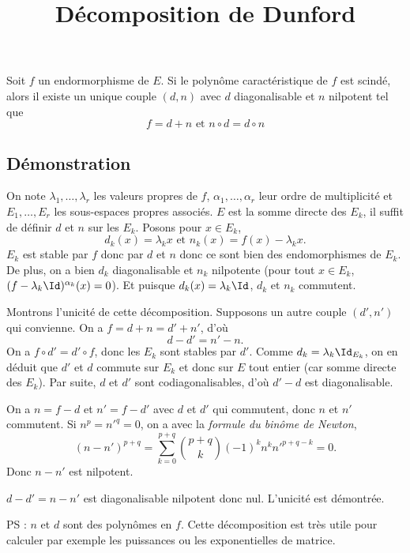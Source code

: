 \documentclass[fontsize=12pt,twoside=false,parskip=half, french]{scrartcl}
\title{Décomposition de Dunford}
\date{}
\author{}
\begin{document}
\maketitle
   \begin{Theoreme}
      Soit $f$ un endormorphisme de $E$. Si le polynôme caractéristique de $f$ est scindé, alors 
      il existe un unique couple $(d, n)$ avec $d$ diagonalisable et $n$ nilpotent tel que
      \[
         f = d + n \text{ et } n \circ d = d \circ n
      \]
   \end{Theoreme}
   \subsection{Démonstration}
      On note $\lambda_1, \ldots, \lambda_r$ les valeurs propres de $f$, $\alpha_1, \ldots, \alpha_r$ leur ordre de 
      multiplicité et $E_1, \ldots, E_r$ les sous-espaces propres associés. $E$ est la somme directe des $E_k$, il 
      suffit de définir $d$ et $n$ sur les $E_k$. Posons pour $x \in E_k$,
      \[
         d_k(x) = \lambda_k x \text{ et } n_k(x) = f(x) - \lambda_k x.
      \]
      $E_k$ est stable par $f$ donc par $d$ et $n$ donc ce sont bien des endomorphismes de $E_k$. De plus, 
      on a bien $d_k$ diagonalisable et $n_k$ nilpotente (pour tout $x \in E_k$, $(f - \lambda_k \Id)^{\alpha_k}(x) = 0$). 
      Et puisque $d_k(x) = \lambda_k \Id$, $d_k$ et $n_k$ commutent.

      Montrons l’unicité de cette décomposition. Supposons un autre couple $(d', n')$ qui convienne. On a $f = d + n = d' + n'$, d'où
      \[
         d - d' = n' - n.
      \]        
      On a $f \circ d' = d' \circ f$, donc les $E_k$ sont stables par $d'$. Comme $d_k = \lambda_k \Id_{E_k}$, on en déduit que $d'$ et $d$ commute sur $E_k$ et donc sur $E$ tout entier (car somme directe des $E_k$). Par suite, $d$ et $d'$ sont codiagonalisables, d'où $d' - d$ est diagonalisable.
      
      On a $n = f - d$ et $n' = f - d'$ avec $d$ et $d'$ qui commutent, donc $n$ et $n'$ 
      commutent. Si $n^p = n'^q = 0$, on a avec la \emph{formule du binôme de Newton},
      \[
         (n - n')^{p + q} = \sum_{k = 0}^{p + q} \binom{p + q}{k} (-1)^k n^k n'^{p + q - k} = 0.
      \]
      Donc $n - n'$ est nilpotent.
      
      $d - d' = n - n'$ est diagonalisable nilpotent donc nul. L’unicité est démontrée.
      
      PS : $n$ et $d$ sont des polynômes en $f$. Cette décomposition est très utile pour calculer par exemple les 
      puissances ou les exponentielles de matrice.
  
      
\end{document}
